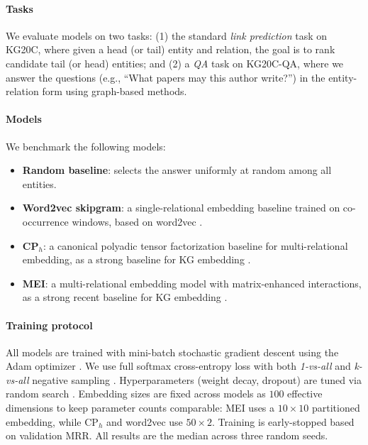 \documentclass[conference]{IEEEtran}
\begin{document}
\paragraph*{Tasks} 
We evaluate models on two tasks: (1) the standard \textit{link prediction} task on KG20C, where given a head (or tail) entity and relation, the goal is to rank candidate tail (or head) entities; and (2) a \textit{QA} task on KG20C-QA, where we answer the questions (e.g., ``What papers may this author write?'') in the entity-relation form using graph-based methods.

\paragraph*{Models} 
We benchmark the following models:
\begin{itemize}
	\item \textbf{Random baseline}: selects the answer uniformly at random among all entities.
	\item \textbf{Word2vec skipgram}: a single-relational embedding baseline trained on co-occurrence windows, based on word2vec \cite{mikolov_distributedrepresentationswords_2013, mikolov_efficientestimationword_2013}.
	\item \textbf{CP$_h$}: a canonical polyadic tensor factorization baseline for multi-relational embedding, as a strong baseline for KG embedding \cite{lacroix_canonicaltensordecomposition_2018}.
	\item \textbf{MEI}: a multi-relational embedding model with matrix-enhanced interactions, as a strong recent baseline for KG embedding \cite{tran_multipartitionembeddinginteraction_2020, tran_meimmultipartitionembedding_2022, tran_multirelationalembeddingknowledge_2020}.
\end{itemize}

\paragraph*{Training protocol}
All models are trained with mini-batch stochastic gradient descent using the Adam optimizer \cite{kingma_adammethodstochastic_2015}. We use full softmax cross-entropy loss with both \textit{1-vs-all} and \textit{k-vs-all} negative sampling \cite{dettmers_convolutional2dknowledge_2018, lacroix_canonicaltensordecomposition_2018}. 
Hyperparameters (weight decay, dropout) are tuned via random search \cite{bergstra_randomsearchhyperparameter_2012}. Embedding sizes are fixed across models as $100$ effective dimensions to keep parameter counts comparable: MEI uses a $10 \times 10$ partitioned embedding, while CP$_h$ and word2vec use $50 \times 2$. 
Training is early-stopped based on validation MRR. All results are the median across three random seeds.
\end{document}
